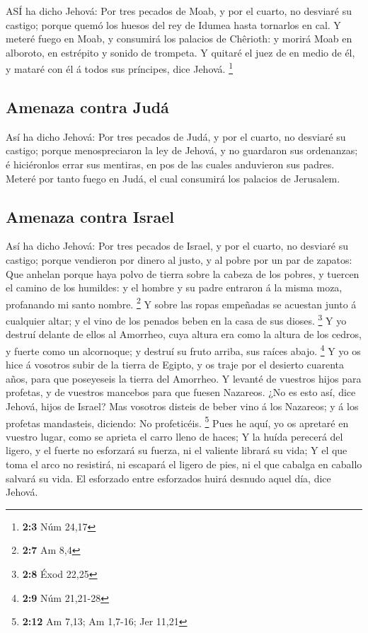  ASÍ ha dicho Jehová: Por tres pecados de Moab, y por el
cuarto, no desviaré su castigo; porque quemó los huesos del rey de
Idumea hasta tornarlos en cal.  Y meteré fuego en Moab, y
consumirá los palacios de Chêrioth: y morirá Moab en alboroto, en
estrépito y sonido de trompeta.  Y quitaré el juez de en
medio de él, y mataré con él á todos sus príncipes, dice Jehová.
\footnote{\textbf{2:3} Núm 24,17}

\hypertarget{amenaza-contra-juduxe1}{%
\subsection{Amenaza contra Judá}\label{amenaza-contra-juduxe1}}

 Así ha dicho Jehová: Por tres pecados de Judá, y por el
cuarto, no desviaré su castigo; porque menospreciaron la ley de Jehová,
y no guardaron sus ordenanzas; é hiciéronlos errar sus mentiras, en pos
de las cuales anduvieron sus padres.  Meteré por tanto fuego
en Judá, el cual consumirá los palacios de Jerusalem.

\hypertarget{amenaza-contra-israel}{%
\subsection{Amenaza contra Israel}\label{amenaza-contra-israel}}

 Así ha dicho Jehová: Por tres pecados de Israel, y por el
cuarto, no desviaré su castigo; porque vendieron por dinero al justo, y
al pobre por un par de zapatos:  Que anhelan porque haya
polvo de tierra sobre la cabeza de los pobres, y tuercen el camino de
los humildes: y el hombre y su padre entraron á la misma moza,
profanando mi santo nombre. \footnote{\textbf{2:7} Am 8,4} 
Y sobre las ropas empeñadas se acuestan junto á cualquier altar; y el
vino de los penados beben en la casa de sus dioses. \footnote{\textbf{2:8}
  Éxod 22,25}  Y yo destruí delante de ellos al Amorrheo,
cuya altura era como la altura de los cedros, y fuerte como un
alcornoque; y destruí su fruto arriba, sus raíces abajo. \footnote{\textbf{2:9}
  Núm 21,21-28}  Y yo os hice á vosotros subir de la tierra
de Egipto, y os traje por el desierto cuarenta años, para que poseyeseis
la tierra del Amorrheo.  Y levanté de vuestros hijos para
profetas, y de vuestros mancebos para que fuesen Nazareos. ¿No es esto
así, dice Jehová, hijos de Israel?  Mas vosotros disteis de
beber vino á los Nazareos; y á los profetas mandasteis, diciendo: No
profeticéis. \footnote{\textbf{2:12} Am 7,13; Am 1,7-16; Jer 11,21}
 Pues he aquí, yo os apretaré en vuestro lugar, como se
aprieta el carro lleno de haces;  Y la huída perecerá del
ligero, y el fuerte no esforzará su fuerza, ni el valiente librará su
vida;  Y el que toma el arco no resistirá, ni escapará el
ligero de pies, ni el que cabalga en caballo salvará su vida.
 El esforzado entre esforzados huirá desnudo aquel día,
dice Jehová.

